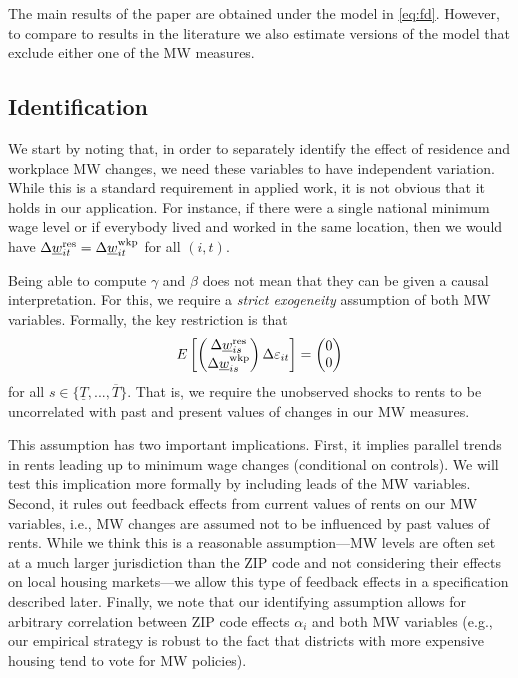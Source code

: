 The main results of the paper are obtained under the model in \eqref{eq:fd}. 
However, to compare to results in the literature we also estimate versions of 
the model that exclude either one of the MW measures.


\subsection{Identification}

We start by noting that, in order to separately identify the effect of 
residence and workplace MW changes, we need these variables to have independent
variation.
While this is a standard requirement in applied work, it is not obvious that it 
holds in our application.
For instance, if there were a single national minimum wage level or if everybody 
lived and worked in the same location, then we would have
$\Delta \underline{w}^{\text{res}}_{it} = \Delta \underline{w}^{\text{wkp}}_{it}$ for all $(i,t)$.

Being able to compute $\gamma$ and $\beta$ does not mean that they can be given
a causal interpretation.
For this, we require a \textit{strict exogeneity} assumption of both MW 
variables.
Formally, the key restriction is that
\begin{equation}\label{eq:strict_exogeneity}
    E\left[
        \begin{pmatrix}
            \Delta \underline{w}^{\text{res}}_{is} \\
            \Delta \underline{w}^{\text{wkp}}_{is} \\
        \end{pmatrix}
        \Delta \varepsilon_{it} \right] =
    \begin{pmatrix}
        0 \\
        0 \\
    \end{pmatrix}
\end{equation}
for all $s\in\{\underline{T}, ..., \overline{T}\}$.
That is, we require the unobserved shocks to rents to be uncorrelated with 
past and present values of changes in our MW measures.

This assumption has two important implications.
First,
it implies parallel trends in rents leading up to minimum wage changes 
(conditional on controls). We will test this implication more formally by 
including leads of the MW variables.
Second,
it rules out feedback effects from current values of rents on our MW variables, 
i.e., MW changes are assumed not to be influenced by past values of rents.
While we think this is a reasonable assumption---MW levels are often set at a 
much larger jurisdiction than the ZIP code and not considering their effects 
on local housing markets---we allow this type of feedback effects in a 
specification described later.
Finally, we note that our identifying assumption allows for arbitrary 
correlation between ZIP code effects $\alpha_i$ and both MW variables
(e.g., our empirical strategy is robust to the fact that districts with more
expensive housing tend to vote for MW policies).

